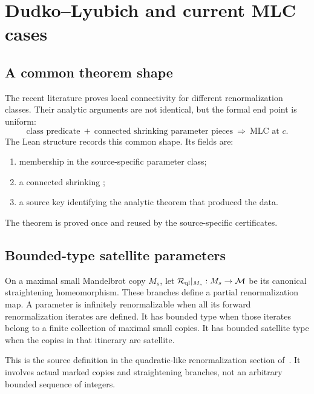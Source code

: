 \chapter{Dudko--Lyubich and current MLC cases}
\label{chap:current-cases}

\section{A common theorem shape}

The recent literature proves local connectivity for different
renormalization classes.  Their analytic arguments are not identical, but
the formal end point is uniform:
\[
 \text{class predicate}
\ +\ \text{connected shrinking parameter pieces}
\ \Longrightarrow\ \text{MLC at }c.
\]
The Lean structure  records this common shape.  Its
fields are:
\begin{enumerate}
\item membership in the source-specific parameter class;
\item a connected shrinking ;
\item a source key identifying the analytic theorem that produced the data.
\end{enumerate}
The theorem
 is proved once and reused by
the source-specific certificates.

\section{Bounded-type satellite parameters}

\begin{definition}
\label{def:bounded-satellite}
On a maximal small Mandelbrot copy $M_s$, let
$\mathcal R_{\rm ql}|_{M_s}:M_s\to\mathcal M$ be its canonical
straightening homeomorphism.  These branches define a partial
renormalization map.  A parameter is infinitely renormalizable when
all its forward renormalization iterates are defined.
It has bounded type when those iterates belong to a finite collection
of maximal small copies.  It has bounded satellite type when the
copies in that itinerary are satellite.
\end{definition}

This is the source definition in the quadratic-like renormalization
section of~\cite{DudkoLyubichSatellite}.  It involves actual marked
copies and straightening branches, not an arbitrary bounded sequence
of integers.

